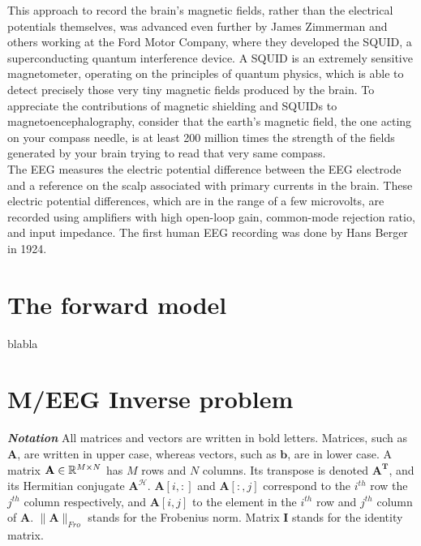 This approach to record the brain's magnetic fields, rather than the electrical potentials themselves, was advanced even further by James Zimmerman and others working at the Ford Motor Company, where they developed the SQUID, a superconducting quantum interference device. A SQUID is an extremely sensitive magnetometer, operating on the principles of quantum physics, which is able to detect precisely those very tiny magnetic fields produced by the brain. To appreciate the contributions of magnetic shielding and SQUIDs to magnetoencephalography, consider that the earth's magnetic field, the one acting on your compass needle, is at least 200 million times the strength of the fields generated by your brain trying to read that very same compass.\\

The EEG measures the electric potential difference between the EEG electrode and a reference on the scalp associated with primary currents in the brain. These electric potential differences, which are in the range of a few microvolts, are recorded using amplifiers with high open-loop gain, common-mode rejection ratio, and input impedance. The first human EEG recording was done by Hans Berger in 1924.\\


\section{The forward model}
blabla
\section{M/EEG Inverse problem}
\emph{\textbf{Notation}}
All matrices and vectors are written in bold letters. Matrices, such as $\mathbf{A}$, are written in upper case, whereas vectors, such as $\mathbf{b}$, are in lower case. A matrix $\mathbf{A} \in \mathbb{R}^{M\times N}$ has $M$ rows and $N$ columns. Its transpose is denoted $\mathbf{A}^\mathbf{T}$, and its Hermitian conjugate $\mathbf{A}^\mathcal{H}$. $\mathbf{A}[i,:]$ and $\mathbf{A}[:,j]$ correspond to the $i^{th}$ row the $j^{th}$ column respectively, and $\mathbf{A}[i,j]$ to the element in the $i^{th}$ row and $j^{th}$ column of $\mathbf{A}$.
$\|\mathbf{A}\|_{Fro}$ stands for the Frobenius norm. Matrix $\mathbf{I}$ stands for the identity matrix.

